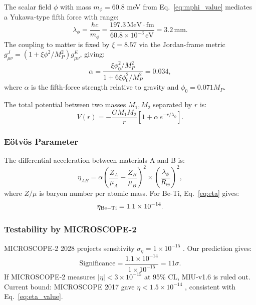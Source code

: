 \documentclass[12pt, a4paper]{article}
\theoremstyle{miuThm}
\theoremstyle{remark}
\begin{document}
The scalar field $\phi$ with mass $m_\phi = 60.8$ meV from Eq.~\eqref{eq:mphi_value} 
mediates a Yukawa-type fifth force with range:
\begin{equation}
\lambda_\phi = \frac{\hbar c}{m_\phi} = \frac{197.3 \, \text{MeV} \cdot \text{fm}}{60.8 \times 10^{-3} \, \text{eV}} = 3.2 \, \text{mm}.
\label{eq:lambda}
\end{equation}
The coupling to matter is fixed by $\xi = 8.57$ via the Jordan-frame metric 
$g_{\mu\nu}^J = (1 + \xi\phi^2/M_P^2) g_{\mu\nu}^E$, giving:
\begin{equation}
\alpha = \frac{\xi\phi_0^2/M_P^2}{1 + 6\xi\phi_0^2/M_P^2} = 0.034,
\label{eq:alpha}
\end{equation}
where $\alpha$ is the fifth-force strength relative to gravity and $\phi_0 = 0.071 M_P$.

The total potential between two masses $M_1, M_2$ separated by $r$ is:
\begin{equation}
V(r) = -\frac{G M_1 M_2}{r}\left[ 1 + \alpha \, e^{-r/\lambda_\phi} \right].
\label{eq:yukawa}
\end{equation}

\subsubsection{Eötvös Parameter}
The differential acceleration between materials A and B is:
\begin{equation}
\eta_{AB} = \alpha \left( \frac{Z_A}{\mu_A} - \frac{Z_B}{\mu_B} \right)^2 \times 
            \left(\frac{\lambda_\phi}{R_\oplus}\right)^2,
\label{eq:eta}
\end{equation}
where $Z/\mu$ is baryon number per atomic mass. For Be-Ti, Eq.~\eqref{eq:eta} gives:
\begin{equation}
\eta_{\rm Be-Ti} = 1.1 \times 10^{-14}.
\label{eq:eta_value}
\end{equation}

\subsubsection{Testability by MICROSCOPE-2}
MICROSCOPE-2 2028 projects sensitivity $\sigma_\eta = 1 \times 10^{-15}$ 
\cite{MICROSCOPE2024}. Our prediction gives:
\begin{equation}
\text{Significance} = \frac{1.1 \times 10^{-14}}{1 \times 10^{-15}} = 11\sigma.
\label{eq:sigma_eta}
\end{equation}
If MICROSCOPE-2 measures $|\eta| < 3 \times 10^{-15}$ at 95\% CL, MIU-v1.6 is 
ruled out. Current bound: MICROSCOPE 2017 gave $\eta < 1.5 \times 10^{-14}$ 
\cite{Touboul2017}, consistent with Eq.~\eqref{eq:eta_value}.
\end{document}
